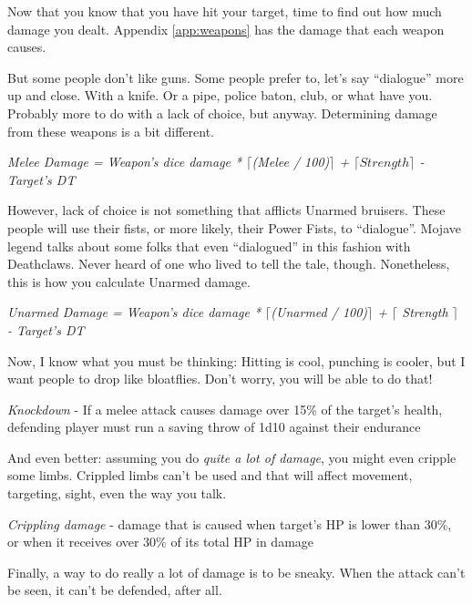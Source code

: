Now that you know that you have hit your target, time to find out how much damage you dealt. Appendix \ref{app:weapons} has the damage that each weapon causes.

But some people don't like guns. Some people prefer to, let's say ``dialogue'' more up and close. With a knife. Or a pipe, police baton, club, or what have you. Probably more to do with a lack of choice, but anyway. Determining damage from these weapons is a bit different.        

\begin{center}
	\textit{Melee Damage = Weapon's dice damage * $\lceil$(Melee / 100)$\rceil$ + $\lceil Strength \rceil$ - Target's DT}
\end{center}

However, lack of choice is not something that afflicts Unarmed bruisers. These people will use their fists, or more likely, their Power Fists, to ``dialogue''. Mojave legend talks about some folks that even ``dialogued'' in this fashion with Deathclaws. Never heard of one who lived to tell the tale, though. Nonetheless, this is how you calculate Unarmed damage.

\begin{center}
        \textit{Unarmed Damage = Weapon's dice damage * $\lceil$(Unarmed / 100)$\rceil$ + $\lceil$ Strength $\rceil$ - Target's DT}
\end{center}

Now, I know what you must be thinking: Hitting is cool, punching is cooler, but I want people to drop like bloatflies. Don't worry, you will be able to do that!

\begin{center}
	\textit{Knockdown} - If a melee attack causes damage over 15\% of the target's health, defending player must run a saving throw of 1d10 against their endurance
\end{center}

And even better: assuming you do \textit{quite a lot of damage}, you might even cripple some limbs. Crippled limbs can't be used and that will affect movement, targeting, sight, even the way you talk.

\begin{center}
        \textit{Crippling damage} - damage that is caused when target's HP is lower than 30\%, or when it receives over 30\% of its total HP in damage
\end{center}

Finally, a way to do really a lot of damage is to be sneaky. When the attack can't be seen, it can't be defended, after all.

